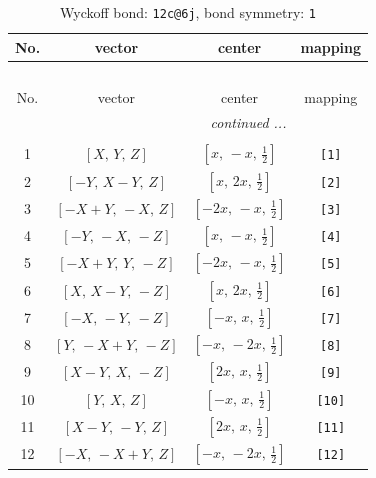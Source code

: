 \documentclass[fleqn,8pt]{jsarticle}
\begin{document}
\begin{longtable}{cccc}
\caption{Wyckoff bond: {\tt 12c@6j}, bond symmetry: {\tt 1}}
 \\
 \hline \hline
No. & vector & center & mapping \\ \hline \endfirsthead

\multicolumn{3}{l}{\tablename\ \thetable{}} \\
 \hline \hline
No. & vector & center & mapping \\ \hline \endhead

 \hline \hline
\multicolumn{3}{r}{\footnotesize\it continued ...} \\ \endfoot

 \hline \hline
\multicolumn{3}{r}{} \\ \endlastfoot

1 & $\left[ X,\, Y,\, Z \right]$ & $\left[ x,\, - x,\, \frac{1}{2} \right]$ & {\tt [1]} \\ \hline
2 & $\left[ - Y,\, X - Y,\, Z \right]$ & $\left[ x,\, 2 x,\, \frac{1}{2} \right]$ & {\tt [2]} \\ \hline
3 & $\left[ - X + Y,\, - X,\, Z \right]$ & $\left[ - 2 x,\, - x,\, \frac{1}{2} \right]$ & {\tt [3]} \\ \hline
4 & $\left[ - Y,\, - X,\, - Z \right]$ & $\left[ x,\, - x,\, \frac{1}{2} \right]$ & {\tt [4]} \\ \hline
5 & $\left[ - X + Y,\, Y,\, - Z \right]$ & $\left[ - 2 x,\, - x,\, \frac{1}{2} \right]$ & {\tt [5]} \\ \hline
6 & $\left[ X,\, X - Y,\, - Z \right]$ & $\left[ x,\, 2 x,\, \frac{1}{2} \right]$ & {\tt [6]} \\ \hline
7 & $\left[ - X,\, - Y,\, - Z \right]$ & $\left[ - x,\, x,\, \frac{1}{2} \right]$ & {\tt [7]} \\ \hline
8 & $\left[ Y,\, - X + Y,\, - Z \right]$ & $\left[ - x,\, - 2 x,\, \frac{1}{2} \right]$ & {\tt [8]} \\ \hline
9 & $\left[ X - Y,\, X,\, - Z \right]$ & $\left[ 2 x,\, x,\, \frac{1}{2} \right]$ & {\tt [9]} \\ \hline
10 & $\left[ Y,\, X,\, Z \right]$ & $\left[ - x,\, x,\, \frac{1}{2} \right]$ & {\tt [10]} \\ \hline
11 & $\left[ X - Y,\, - Y,\, Z \right]$ & $\left[ 2 x,\, x,\, \frac{1}{2} \right]$ & {\tt [11]} \\ \hline
12 & $\left[ - X,\, - X + Y,\, Z \right]$ & $\left[ - x,\, - 2 x,\, \frac{1}{2} \right]$ & {\tt [12]} \\
\end{longtable}
\end{document}
